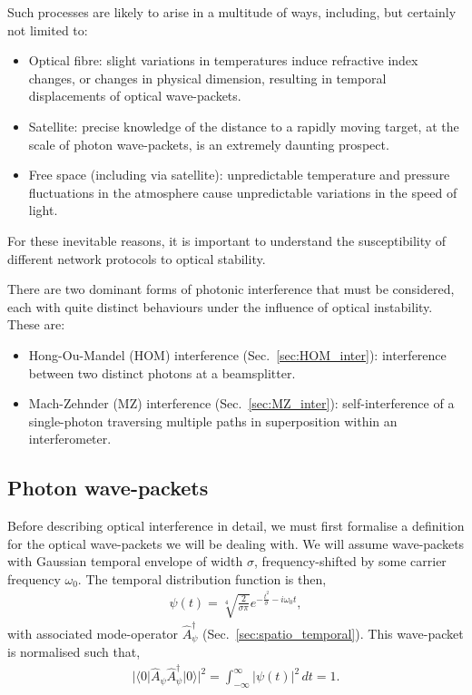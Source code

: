 \documentclass[aps, rmp, twocolumn, amsmath, amssymb, nofootinbib, superscriptaddress, longbibliography, floatfix, table-of-contents, eqsecnum]{revtex4-1}
\newcommand{\bra}[1]{\langle#1|}
\newcommand{\ket}[1]{|#1\rangle}
\begin{document}
Such processes are likely to arise in a multitude of ways, including, but certainly not limited to:
\begin{itemize}
	\item Optical fibre: slight variations in temperatures induce refractive index changes, or changes in physical dimension, resulting in temporal displacements of optical wave-packets.
	\item Satellite: precise knowledge of the distance to a rapidly moving target, at the scale of photon wave-packets, is an extremely daunting prospect.
	\item Free space (including via satellite): unpredictable temperature and pressure fluctuations in the atmosphere cause unpredictable variations in the speed of light.
\end{itemize}

For these inevitable reasons, it is important to understand the susceptibility of different network protocols to optical stability. 

There are two dominant forms of photonic interference that must be considered, each with quite distinct behaviours under the influence of optical instability. These are:
\begin{itemize}	
	\item Hong-Ou-Mandel (HOM) interference (Sec.~\ref{sec:HOM_inter}):  interference between two distinct photons at a beamsplitter.
	\item Mach-Zehnder (MZ) interference (Sec.~\ref{sec:MZ_inter}): self-interference of a single-photon traversing multiple paths in superposition within an interferometer.
\end{itemize}

%
%

\subsection{Photon wave-packets} 

Before describing optical interference in detail, we must first formalise a definition for the optical wave-packets we will be dealing with. We will assume wave-packets with Gaussian temporal envelope of width $\sigma$, frequency-shifted by some carrier frequency $\omega_0$. The temporal distribution function is then,
\begin{align} \label{eq:wavepacket_modulated}
\psi(t) = \sqrt[4]{\frac{2}{\sigma\pi}}e^{-\frac{t^2}{\sigma}-i\omega_0t},
\end{align}
with associated mode-operator $\hat{A}^\dag_\psi$ (Sec.~\ref{sec:spatio_temporal}). This wave-packet is normalised such that,
\begin{align}
|\bra{0} \hat{A}_\psi \hat{A}_\psi^\dag \ket{0}|^2 = \int_{-\infty}^\infty |\psi(t)|^2 \, dt = 1.
\end{align}
\end{document}

